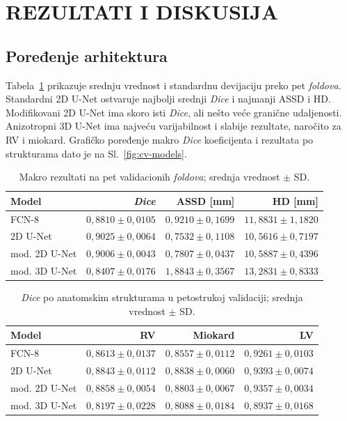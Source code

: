 \documentclass[11pt,a4paper]{article}
\begin{document}
\section{REZULTATI I DISKUSIJA}
\subsection{Poređenje arhitektura}
Tabela~\ref{tab:cv-main} prikazuje srednju vrednost i standardnu devijaciju preko pet \textit{foldova}.
Standardni 2D U-Net ostvaruje najbolji srednji \textit{Dice} i najmanji ASSD i HD. Modifikovani 2D U-Net ima
skoro isti \textit{Dice}, ali nešto veće granične udaljenosti. Anizotropni 3D U-Net ima najveću
varijabilnost i slabije rezultate, naročito za RV i miokard.
Grafičko poređenje makro \textit{Dice} koeficijenta i rezultata po strukturama dato je na Sl.~\ref{fig:cv-models}.

\begin{table}[H]
	\centering
	\caption{Makro rezultati na pet validacionih \textit{foldova}; srednja vrednost $\pm$ SD.}
	\label{tab:cv-main}
	\begin{tabular}{lrrr}
		\toprule
		Model         & \textit{Dice}                       & ASSD [mm]                  & HD [mm]                     \\
		\midrule
		FCN-8         & $0,8810\pm0,0105$          & $0,9210\pm0,1699$          & $11,8831\pm1,1820$          \\
		2D U-Net      & \textbf{$0,9025\pm0,0064$} & \textbf{$0,7532\pm0,1108$} & \textbf{$10,5616\pm0,7197$} \\
		mod. 2D U-Net & $0,9006\pm0,0043$          & $0,7807\pm0,0437$          & $10,5887\pm0,4396$          \\
		mod. 3D U-Net & $0,8407\pm0,0176$          & $1,8843\pm0,3567$          & $13,2831\pm0,8333$          \\
		\bottomrule
	\end{tabular}
\end{table}

\begin{table}[H]
	\centering
	\caption{\textit{Dice} po anatomskim strukturama u petostrukoj validaciji; srednja vrednost $\pm$ SD.}
	\label{tab:cv-class}
	\begin{tabular}{lrrr}
		\toprule
		Model         & RV                         & Miokard           & LV                         \\
		\midrule
		FCN-8         & $0,8613\pm0,0137$          & $0,8557\pm0,0112$ & $0,9261\pm0,0103$          \\
		2D U-Net      & $0,8843\pm0,0112$          & $0,8838\pm0,0060$ & \textbf{$0,9393\pm0,0074$} \\
		mod. 2D U-Net & \textbf{$0,8858\pm0,0054$} & $0,8803\pm0,0067$ & $0,9357\pm0,0034$          \\
		mod. 3D U-Net & $0,8197\pm0,0228$          & $0,8088\pm0,0184$ & $0,8937\pm0,0168$          \\
		\bottomrule
	\end{tabular}
\end{table}
\end{document}
